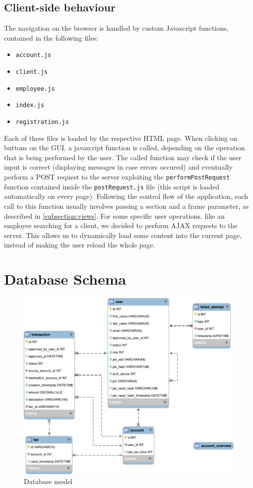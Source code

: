 \subsection{Client-side behaviour}
The navigation on the browser is handled by custom Javascript functions, contained in the following files:
\begin{itemize}
	\item \texttt{account.js}
	\item \texttt{client.js}
	\item \texttt{employee.js}
	\item \texttt{index.js}
	\item \texttt{registration.js}
\end{itemize}
Each of these files is loaded by the respective HTML page. When clicking on buttons on the GUI, a javascript function is called, depending on the operation that is being performed by the user. The called function may check if the user input is correct (displaying messages in case errors occured) and eventually perform a POST request to the server exploiting the \texttt{performPostRequest} function contained inside the \texttt{postRequest.js} file (this script is loaded automatically on every page). Following the control flow of the application, each call to this function usually involves passing a section and a frame parameter, as described in \autoref{subsection:views}.\newline
For some specific user operations, like an employee searching for a client, we decided to perform AJAX requests to the server. This allows us to dynamically load some content into the current page, instead of making the user reload the whole page.


\section{Database Schema}\label{section:db}
\begin{figure}[h!tbp]
	\centering
	\includegraphics[width=\textwidth]{figures/database_model}
	\caption{Database model}
	\label{figure:dbmodel}
\end{figure}

